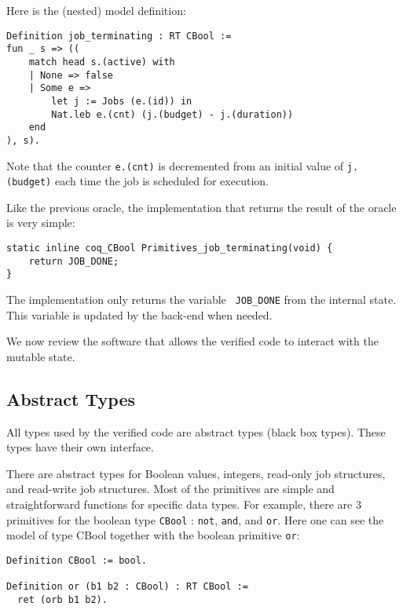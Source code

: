 	\vspace{1cm}

	Here is the (nested) model definition:

	\begin{verbatim}
Definition job_terminating : RT CBool :=
fun _ s => ((
    match head s.(active) with
    | None => false
    | Some e =>
        let j := Jobs (e.(id)) in
        Nat.leb e.(cnt) (j.(budget) - j.(duration))
    end
), s).
	\end{verbatim}

	Note that the counter \texttt{e.(cnt)} is decremented from an initial value of \texttt{j.(budget)} each time the job is scheduled for execution. 

	Like the previous oracle, the implementation that returns the result of the oracle is very simple:

	\begin{verbatim}
static inline coq_CBool Primitives_job_terminating(void) {
    return JOB_DONE;
}
	\end{verbatim}

	The implementation only returns the variable \texttt{ JOB\_DONE} from the internal state. This variable is updated by the back-end when needed.

	We now review the software that allows the verified code to interact with the mutable state.

	\subsection{Abstract Types}

	All types used by the verified code are abstract types (black box types). These types have their own interface. 

	There are abstract types for Boolean values, integers, read-only job structures, and read-write job structures. Most of the primitives are simple and straightforward functions for specific data types. For example, there are 3 primitives for the boolean type \texttt{CBool} : \texttt{not}, \texttt{and}, and \texttt{or}.
	Here one can see the model of type CBool together with the boolean primitive \texttt{or}:

	\begin{verbatim}
Definition CBool := bool.

Definition or (b1 b2 : CBool) : RT CBool :=
  ret (orb b1 b2).
	\end{verbatim}

